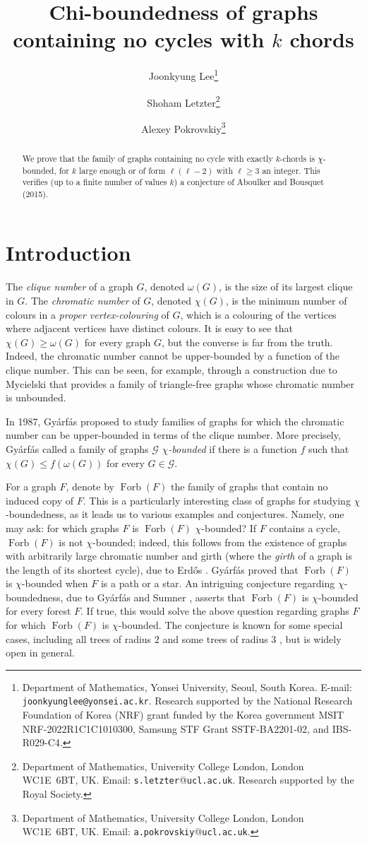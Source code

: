 \documentclass[11pt,english]{article}
\title{Chi-boundedness of graphs containing no cycles with $k$ chords}
\author{
	Joonkyung Lee\thanks{Department of Mathematics, Yonsei University, Seoul, South Korea.
E-mail: \texttt{joonkyunglee@yonsei.ac.kr}.
	Research supported by the National Research Foundation of Korea (NRF) grant funded by the Korea government MSIT NRF-2022R1C1C1010300, Samsung STF Grant SSTF-BA2201-02, and IBS-R029-C4.} 
	\and
	Shoham Letzter\thanks{
		Department of Mathematics, 
		University College London, 
		London WC1E~6BT, UK. 
		Email: \texttt{s.letzter}@\texttt{ucl.ac.uk}. 
		Research supported by the Royal Society.
    }
    \and
	Alexey Pokrovskiy\thanks{
	    Department of Mathematics, 
	    University College London,
	    London WC1E~6BT, UK.
	    Email: \texttt{a.pokrovskiy}@\texttt{ucl.ac.uk}.
	}
}
\theoremstyle{plain}
\theoremstyle{definition}
\theoremstyle{remark}
\newcommand{\G}{\mathcal{G}}
\DeclareMathOperator{\Forb}{Forb}
\begin{document}
\date{}
\maketitle

\begin{abstract}
    \noindent
    We prove that the family of graphs containing no cycle with exactly $k$-chords is $\chi$-bounded, for $k$ large enough or of form $\ell(\ell-2)$ with $\ell \ge 3$ an integer. This verifies (up to a finite number of values $k$) a conjecture of Aboulker and Bousquet (2015).

\end{abstract}

\section{Introduction} \label{sec:intro}
    The \emph{clique number} of a graph $G$, denoted $\omega(G)$, is the size of its largest clique in $G$. The \emph{chromatic number} of $G$, denoted $\chi(G)$, is the minimum number of colours in a \emph{proper vertex-colouring} of $G$, which is a colouring of the vertices where adjacent vertices have distinct colours. 
    It is easy to see that $\chi(G) \ge \omega(G)$ for every graph $G$, but the converse is far from the truth. Indeed, the chromatic number cannot be upper-bounded by a function of the clique number. This can be seen, for example, through a construction due to Mycielski \cite{mycielski1955coloriage} that provides a family of triangle-free graphs whose chromatic number is unbounded. 
    
    In 1987, Gy\'arf\'as \cite{gyarfas1987problems} proposed to study families of graphs for which the chromatic number can be upper-bounded in terms of the clique number. More precisely, Gy\'arf\'as called a family of graphs $\G$ \emph{$\chi$-bounded} if there is a function $f$ such that $\chi(G) \le f(\omega(G))$ for every $G \in \G$. 
    
    For a graph $F$, denote by $\Forb(F)$ the family of graphs that contain no induced copy of $F$. 
    This is a particularly interesting class of graphs for studying $\chi$-boundedness, as it leads us to various examples and conjectures. Namely, one may ask:
    for which graphs $F$ is $\Forb(F)$ $\chi$-bounded?
    If $F$ contains a cycle, $\Forb(F)$ is not $\chi$-bounded; indeed, this follows from the existence of graphs with arbitrarily large chromatic number and girth (where the \emph{girth} of a graph is the length of its shortest cycle), due to Erd\H{o}s \cite{erdos1959graph}.
    Gy\'arf\'as proved \cite{gyarfas1987problems} that $\Forb(F)$ is $\chi$-bounded when $F$ is a path or a star. 
    An intriguing conjecture regarding $\chi$-boundedness, due to Gy\'arf\'as \cite{gyarfas1975ramsey} and Sumner \cite{sumner1981subtrees}, asserts that $\Forb(F)$ is $\chi$-bounded for every forest $F$.
    If true, this would solve the above question regarding graphs $F$ for which $\Forb(F)$ is $\chi$-bounded. 
    The conjecture is known for some special cases, including all trees of radius $2$ \cite{kierstead1994radius} and some trees of radius $3$ \cite{kierstead2004radius}, but is widely open in general.
    
\end{document}
